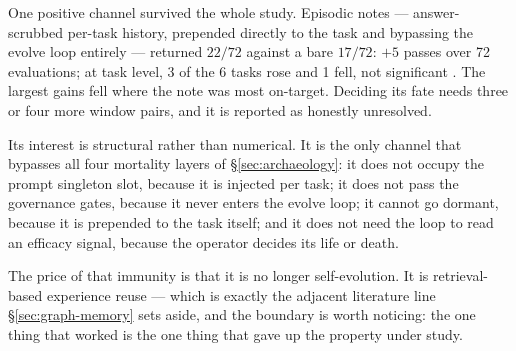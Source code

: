 One positive channel survived the whole study. Episodic notes ---
answer-scrubbed per-task history, prepended directly to the task and
bypassing the evolve loop entirely --- returned $22/72$ against a bare
$17/72$: $+5$ passes over 72 evaluations; at task level, 3 of the 6 tasks
rose and 1 fell, not significant . The
largest gains fell where the note was most on-target. Deciding its fate
needs three or four more window pairs, and it is reported as honestly
unresolved.

Its interest is structural rather than numerical. It is the only channel
that bypasses all four mortality layers of \S\ref{sec:archaeology}: it does
not occupy the prompt singleton slot, because it is injected per task; it
does not pass the governance gates, because it never enters the evolve
loop; it cannot go dormant, because it is prepended to the task itself; and
it does not need the loop to read an efficacy signal, because the operator
decides its life or death.

The price of that immunity is that it is no longer self-evolution. It is
retrieval-based experience reuse --- which is exactly the adjacent
literature line \S\ref{sec:graph-memory} sets aside, and the boundary is
worth noticing: the one thing that worked is the one thing that gave up the
property under study.
